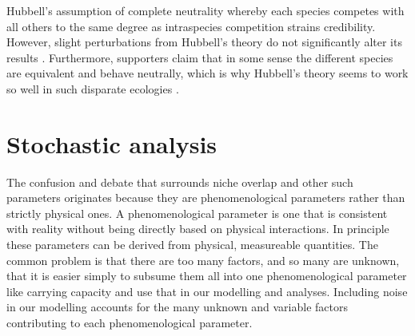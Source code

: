 Hubbell's assumption of complete neutrality whereby each species competes with all others to the same degree as intraspecies competition strains credibility. 
However, slight perturbations from Hubbell's theory do not significantly alter its results  \cite{Rosindell2011}. 
Furthermore, supporters claim that in some sense the different species are equivalent and behave neutrally, which is why Hubbell's theory seems to work so well in such disparate ecologies \cite{Leibold2006,Leigh2007,Hubbell2006,Rosindell2011}. 



\section{Stochastic analysis}

The confusion and debate that surrounds niche overlap and other such parameters originates because they are phenomenological parameters rather than strictly physical ones. 
A phenomenological parameter is one that is consistent with reality without being directly based on physical interactions. 
In principle these parameters can be derived from physical, measureable quantities. %
The common problem is that there are too many factors, and so many are unknown, that it is easier simply to subsume them all into one phenomenological parameter like carrying capacity and use that in our modelling and analyses. 
Including noise in our modelling accounts for the many unknown and variable factors contributing to each phenomenological parameter. 

